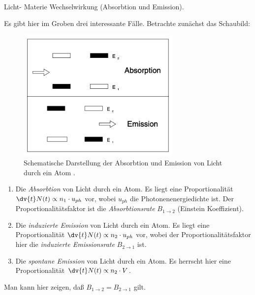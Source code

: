 \documentclass{subfiles}
\begin{document}
    \begin{Frage}
        Licht- Materie Wechselwirkung (Absorbtion und Emission).
    \end{Frage}
    \begin{Antwort}
        Es gibt hier im Groben drei interessante Fälle. Betrachte zunächst das Schaubild:
        \begin{figure}[H]
            \centering
            \includegraphics[width=8cm]{Bilddateien/AbsorptionEmission.png}
            \caption{Schematische Darstellung der Absorbtion und Emission von Licht durch ein Atom \cite{exp8-paper}.}
            \label{fig:AbsorptionEmission}
        \end{figure}
        \begin{enumerate}
            \item Die \emph{Absorbtion} von Licht durch ein Atom. Es liegt eine Proportionalität $\dv{t}N(t)\propto n_1\cdot u_{ph}$ vor, wobei $u_{ph}$ die Photonenenergiedichte ist. Der Proportionalitätsfaktor ist die \emph{Absorbtionsrate} $B_{1\to 2}$ (Einstein Koeffizient).
            \item Die \emph{induzierte Emission} von Licht durch ein Atom. Es liegt eine Proportionalität $\dv{t}N(t)\propto n_2\cdot u_{ph}$ vor, wobei der Proportionalitätsfaktor hier die \emph{induzierte Emissionsrate} $B_{2\to 1}$ ist.
            \item Die \emph{spontane Emission} von Licht durch ein Atom. Es herrscht hier eine Proportionalität $\dv{t}N(t) \propto n_2\cdot V$. 
        \end{enumerate}
        Man kann hier zeigen, daß $B_{1\to 2} = B_{2\to 1}$ gilt. 
        \begin{figure}[H]
            \centering
            \begin{subfigure}[t]{0.4\textwidth}
                \centering

\end{subfigure}
\end{figure}
\end{Antwort}
\end{document}
